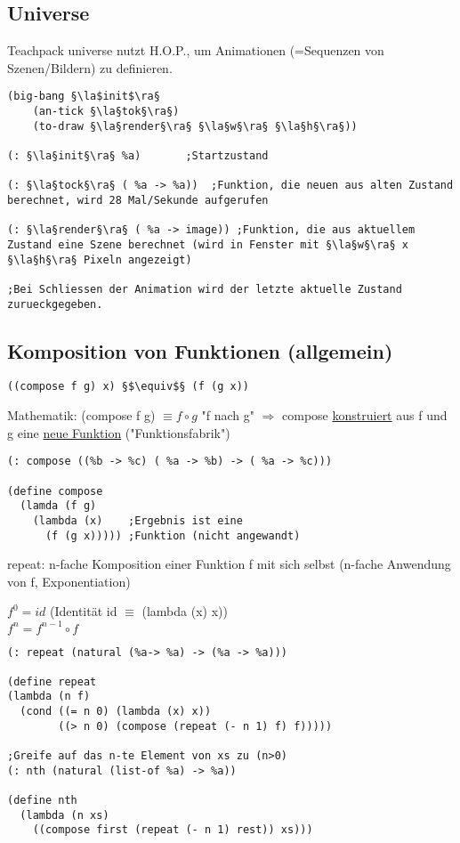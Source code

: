 \documentclass[a4paper,12pt]{article}
\newcommand{\la}{$\langle$}
\newcommand{\ra}{$\rangle$}
\begin{document}
\subsection{Universe}
Teachpack universe nutzt H.O.P., um Animationen (=Sequenzen von Szenen/Bildern) zu definieren.
\begin{lstlisting}[style=customc]
(big-bang §\la$init$\ra§
	(an-tick §\la§tok§\ra§)
	(to-draw §\la§render§\ra§ §\la§w§\ra§ §\la§h§\ra§))
		   
(: §\la§init§\ra§ %a)    	;Startzustand

(: §\la§tock§\ra§ ( %a -> %a))	;Funktion, die neuen aus alten Zustand berechnet, wird 28 Mal/Sekunde aufgerufen 

(: §\la§render§\ra§ ( %a -> image)) ;Funktion, die aus aktuellem Zustand eine Szene berechnet (wird in Fenster mit §\la§w§\ra§ x §\la§h§\ra§ Pixeln angezeigt)

;Bei Schliessen der Animation wird der letzte aktuelle Zustand zurueckgegeben.

\end{lstlisting}
\subsection{Komposition von Funktionen (allgemein)}
\begin{lstlisting}[style=customc]
((compose f g) x) §$\equiv$§ (f (g x))
\end{lstlisting}
Mathematik: (compose f g) $\equiv f \circ g $ "f nach g" $\Rightarrow$ compose \uline{konstruiert} aus f und g eine \uline{neue Funktion} ("Funktionsfabrik")
\begin{lstlisting}[style=customc]
(: compose ((%b -> %c) ( %a -> %b) -> ( %a -> %c)))

(define compose
  (lamda (f g)
    (lambda (x)    ;Ergebnis ist eine
      (f (g x))))) ;Funktion (nicht angewandt)
\end{lstlisting}

repeat: n-fache Komposition einer Funktion f mit sich selbst (n-fache Anwendung von f, Exponentiation)
\begin{center}
$f^0 = id$ (Identität id $\equiv$ (lambda (x) x))\\
$f^n = f^{n-1} \circ f$
\end{center}
\begin{lstlisting}[style=customc]
(: repeat (natural (%a-> %a) -> (%a -> %a)))

(define repeat
(lambda (n f)
  (cond ((= n 0) (lambda (x) x))
        ((> n 0) (compose (repeat (- n 1) f) f)))))
        
;Greife auf das n-te Element von xs zu (n>0)
(: nth (natural (list-of %a) -> %a)) 

(define nth
  (lambda (n xs)
    ((compose first (repeat (- n 1) rest)) xs)))        
\end{lstlisting}
\end{document}
